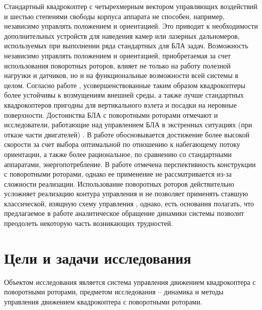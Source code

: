 Стандартный квадрокоптер с четырехмерным вектором управляющих воздействий и шестью степенями свободы корпуса аппарата не способен, например, независимо управлять положением и ориентацией.
Это приводит к необходимости дополнительных устройств для наведения камер или лазерных дальномеров, используемых при выполнении ряда стандартных для БЛА задач.
Возможность независимо управлять положением и ориентацией, приобретаемая за счет использования поворотных роторов, влияет не только на работу полезной нагрузки и датчиков, но и на функциональные возможности всей системы в целом.
Согласно работе \cite{Stolc01}, усовершенствованные таким образом квадрокоптеры более устойчивы к возмущениям внешней среды, а также лучше стандартных квадрокоптеров пригодны для вертикального взлета и посадки на неровные поверхности.
Достоинства БЛА с поворотными роторами отмечают и исследователи, работающие над управлением БЛА в экстренных ситуациях (при отказе части двигателей) \cite{Morozov01, Shidar00}.
В работе \cite{Shidar00} обосновывается достижение более высокой скорости за счет выбора оптимальной по отношению к набегающему потоку ориентации, а также более рациональное, по сравнению со стандартными аппаратами, энергопотребление.
В работе \cite{Morozov01} отмечена перспективность конструкции с поворотными роторами, однако ее применение не рассматривается из-за сложности реализации.
Использование поворотных роторов действительно усложняет реализацию контура управления \cite{Ryll01, Falconi01, Segui01, Oosedo01} и не позволяет применять ставшую классической, изящную схему управления \cite{Mellinger01}, однако, есть основания полагать, что предлагаемое в работе аналитическое обращение динамики системы позволит преодолеть некоторую часть возникающих трудностей.

\section{Цели и задачи исследования}

Объектом исследования является система управления движением квадрокоптера с поворотными роторами, предметом исследования -- динамика и методы управления движением квадрокоптера с поворотными роторами.

